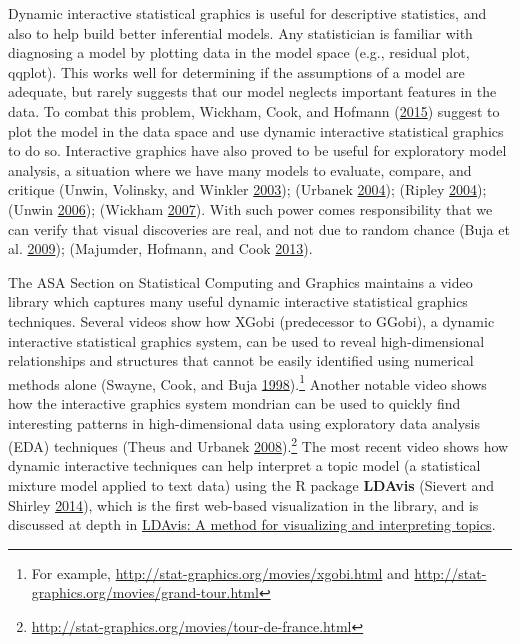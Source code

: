 \documentclass[12pt,]{isuthesis}
\let\rmarkdownfootnote\footnote%
\def\footnote{\protect\rmarkdownfootnote}
\begin{document}
Dynamic interactive statistical graphics is useful for descriptive
statistics, and also to help build better inferential models. Any
statistician is familiar with diagnosing a model by plotting data in the
model space (e.g., residual plot, qqplot). This works well for
determining if the assumptions of a model are adequate, but rarely
suggests that our model neglects important features in the data. To
combat this problem, Wickham, Cook, and Hofmann
(\protect\hyperlink{ref-Wickham:2015ur}{2015}) suggest to plot the model
in the data space and use dynamic interactive statistical graphics to do
so. Interactive graphics have also proved to be useful for exploratory
model analysis, a situation where we have many models to evaluate,
compare, and critique (Unwin, Volinsky, and Winkler
\protect\hyperlink{ref-Unwin:2003uy}{2003}); (Urbanek
\protect\hyperlink{ref-Urbanek:2004}{2004}); (Ripley
\protect\hyperlink{ref-Ripley:2004}{2004}); (Unwin
\protect\hyperlink{ref-Unwin:2006}{2006}); (Wickham
\protect\hyperlink{ref-Wickham:2007wq}{2007}). With such power comes
responsibility that we can verify that visual discoveries are real, and
not due to random chance (Buja et al.
\protect\hyperlink{ref-Buja:2009hp}{2009}); (Majumder, Hofmann, and Cook
\protect\hyperlink{ref-Majumder:2013ie}{2013}).

The ASA Section on Statistical Computing and Graphics maintains a video
library which captures many useful dynamic interactive statistical
graphics techniques. Several videos show how XGobi (predecessor to
GGobi), a dynamic interactive statistical graphics system, can be used
to reveal high-dimensional relationships and structures that cannot be
easily identified using numerical methods alone (Swayne, Cook, and Buja
\protect\hyperlink{ref-xgobi}{1998}).\footnote{For example,
  \url{http://stat-graphics.org/movies/xgobi.html} and
  \url{http://stat-graphics.org/movies/grand-tour.html}} Another notable
video shows how the interactive graphics system mondrian can be used to
quickly find interesting patterns in high-dimensional data using
exploratory data analysis (EDA) techniques (Theus and Urbanek
\protect\hyperlink{ref-mondrianbook}{2008}).\footnote{\url{http://stat-graphics.org/movies/tour-de-france.html}}
The most recent video shows how dynamic interactive techniques can help
interpret a topic model (a statistical mixture model applied to text
data) using the R package \textbf{LDAvis} (Sievert and Shirley
\protect\hyperlink{ref-Sievert:2014b}{2014}), which is the first
web-based visualization in the library, and is discussed at depth in
\protect\hyperlink{ldavis-a-method-for-visualizing-and-interpreting-topics}{LDAvis:
A method for visualizing and interpreting topics}.
\end{document}

